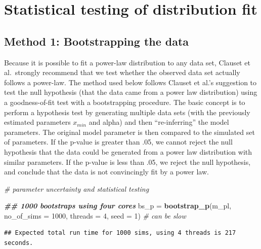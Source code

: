 \documentclass[
]{book}
\newenvironment{Shaded}{\begin{snugshade}}{\end{snugshade}}
\newcommand{\AttributeTok}[1]{\textcolor[rgb]{0.13,0.29,0.53}{#1}}
\newcommand{\CommentTok}[1]{\textcolor[rgb]{0.56,0.35,0.01}{\textit{#1}}}
\newcommand{\DecValTok}[1]{\textcolor[rgb]{0.00,0.00,0.81}{#1}}
\newcommand{\DocumentationTok}[1]{\textcolor[rgb]{0.56,0.35,0.01}{\textbf{\textit{#1}}}}
\newcommand{\FunctionTok}[1]{\textcolor[rgb]{0.13,0.29,0.53}{\textbf{#1}}}
\newcommand{\NormalTok}[1]{#1}
\newcommand{\OtherTok}[1]{\textcolor[rgb]{0.56,0.35,0.01}{#1}}
\newcommand{\SpecialCharTok}[1]{\textcolor[rgb]{0.81,0.36,0.00}{\textbf{#1}}}
\begin{document}
\section{Statistical testing of distribution fit}\label{statistical-testing-of-distribution-fit}

\subsection{Method 1: Bootstrapping the data}\label{method-1-bootstrapping-the-data}

Because it is possible to fit a power-law distribution to any data set, Clauset et al.~strongly recommend that we test whether the observed data set actually follows a power-law. The method used below follows Clauset et al.'s suggestion to test the null hypothesis (that the data came from a power law distribution) using a goodness-of-fit test with a bootstrapping procedure. The basic concept is to perform a hypothesis test by generating multiple data sets (with the previously estimated parameters \(x_{min}\) and alpha) and then ``re-inferring'' the model parameters. The original model parameter is then compared to the simulated set of parameters. If the p-value is greater than .05, we cannot reject the null hypothesis that the data could be generated from a power law distribution with similar parameters. If the p-value is less than .05, we reject the null hypothesis, and conclude that the data is not convincingly fit by a power law.

\begin{Shaded}
\begin{Highlighting}[]
\CommentTok{\# parameter uncertainty and statistical testing }

\DocumentationTok{\#\# 1000 bootstraps using four cores}
\NormalTok{bs\_p }\OtherTok{=} \FunctionTok{bootstrap\_p}\NormalTok{(m\_pl, }\AttributeTok{no\_of\_sims =} \DecValTok{1000}\NormalTok{, }\AttributeTok{threads =} \DecValTok{4}\NormalTok{, }\AttributeTok{seed =} \DecValTok{1}\NormalTok{) }\CommentTok{\# can be slow}
\end{Highlighting}
\end{Shaded}

\begin{verbatim}
## Expected total run time for 1000 sims, using 4 threads is 217 seconds.
\end{verbatim}

\begin{Shaded}
\end{Shaded}
\end{document}

